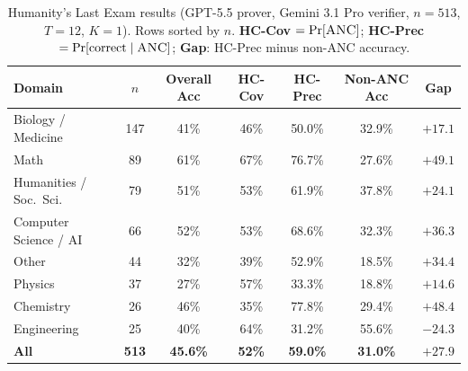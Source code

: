 \begin{table}[h]
\centering
\caption{Humanity's Last Exam results (GPT-5.5 prover, Gemini 3.1 Pro verifier, $n{=}513$, $T{=}12$, $K{=}1$). Rows sorted by $n$. \textbf{HC-Cov} $= \Pr[\textsc{ANC}]$; \textbf{HC-Prec} $= \Pr[\text{correct} \mid \textsc{ANC}]$; \textbf{Gap}: HC-Prec minus non-ANC accuracy.}
\label{tab:hle}
\small
\setlength{\tabcolsep}{5pt}
\begin{tabular}{lcccccc}
\toprule
\textbf{Domain} & $n$ & \textbf{Overall Acc} & \textbf{HC-Cov} & \textbf{HC-Prec} & \textbf{Non-ANC Acc} & \textbf{Gap} \\
\midrule
Biology / Medicine & 147 & 41\% & 46\% & 50.0\% & 32.9\% & $+17.1$ \\
Math & 89 & 61\% & 67\% & 76.7\% & 27.6\% & $+49.1$ \\
Humanities / Soc.\ Sci. & 79 & 51\% & 53\% & 61.9\% & 37.8\% & $+24.1$ \\
Computer Science / AI & 66 & 52\% & 53\% & 68.6\% & 32.3\% & $+36.3$ \\
Other & 44 & 32\% & 39\% & 52.9\% & 18.5\% & $+34.4$ \\
Physics & 37 & 27\% & 57\% & 33.3\% & 18.8\% & $+14.6$ \\
Chemistry & 26 & 46\% & 35\% & 77.8\% & 29.4\% & $+48.4$ \\
Engineering & 25 & 40\% & 64\% & 31.2\% & 55.6\% & $-24.3$ \\
\midrule
\textbf{All} & \textbf{513} & \textbf{45.6\%} & \textbf{52\%} & \textbf{59.0\%} & \textbf{31.0\%} & $\mathbf{+27.9}$ \\
\bottomrule
\end{tabular}
\end{table}
